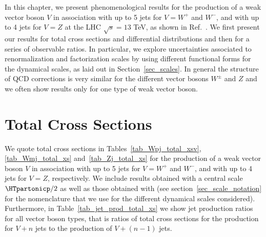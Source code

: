 In this chapter, we present phenomenological
results for the production of a weak vector boson $V$ in association
with up to 5 jets for $V=W^+$ and $W^-$, and with up to 4 jets for
$V=Z$ at the LHC $\sqrt{s} = 13$ TeV, as shown in Ref.~\cite{Anger:2017nkq}. We
first present our results for total cross sections and differential
distributions and then for a series of observable ratios. In
particular, we explore uncertainties associated to renormalization
and factorization scales by using different functional forms for the
dynamical scales, as laid out in Section~\ref{sec_scales}. In general the structure of QCD corrections is very similar for the
different vector bosons $W^\pm$ and $Z$ and we often show results only for one type of weak vector boson.

\section{Total Cross Sections}
\label{totalxsv}
We quote total cross sections in Tables~\ref{tab_Wpj_total_xsv}, \ref{tab_Wmj_total_xs}
and~\ref{tab_Zj_total_xs} for the production of
a weak vector boson $V$ in association with up to 5 jets for $V=W^+$ and $W^-$,
and with up to 4 jets for $V=Z$, respectively. We include
results obtained with a central scale
$\HTpartonicp/2$ as well as those obtained with \MINLOp{} (see
section~\ref{sec_scale_notation} for the nomenclature that we use for the
different dynamical scales considered). Furthermore, in
Table~\ref{tab_jet_prod_total_xs} we show jet production
ratios~\cite{JetRatios1,JetRatios2,JetRatios3,JetRatios4,BH:Wratios}
for all vector boson types, that is ratios of total cross sections for the production for $V+n$ jets to the
production of $V+(n-1)$ jets.

